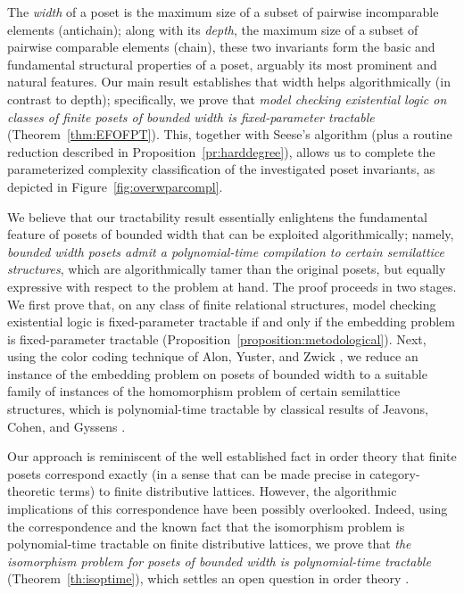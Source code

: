 \documentclass[usletter]{article}
\begin{document}
The \emph{width} of a poset is the maximum size of a subset of pairwise incomparable elements (antichain); 
along with its \emph{depth}, the maximum size of a subset of pairwise comparable elements (chain), 
these two invariants form the basic and fundamental structural properties of a poset, 
arguably its most prominent and natural features.  Our main result establishes that 
width helps algorithmically (in contrast to depth); specifically, 
we prove that \emph{model checking existential logic on classes of finite posets 
of bounded width is fixed-parameter tractable} (Theorem~\ref{thm:EFOFPT}).  
This, together with Seese's  algorithm (plus a routine reduction described in Proposition~\ref{pr:harddegree}), allows us 
to complete the parameterized complexity classification of the investigated poset invariants, 
as depicted in Figure~\ref{fig:overwparcompl}.


We believe that our tractability result essentially enlightens the fundamental feature of posets of bounded width 
that can be exploited algorithmically; namely, \emph{bounded width posets admit a polynomial-time compilation to certain semilattice structures}, which 
are algorithmically tamer than the original posets, but equally expressive with respect to the problem at hand.  
The proof proceeds in two stages.  We first prove that, on any class of finite relational structures, 
model checking existential logic is fixed-parameter tractable if and only 
if the embedding problem is fixed-parameter tractable (Proposition~\ref{proposition:metodological}). Next, 
using 
the color coding technique of Alon, Yuster, and Zwick \cite{AlonYusterZwick95}, 
we reduce an instance of the embedding problem on posets of bounded width to 
a suitable family of instances of the homomorphism problem of certain semilattice structures, 
which is polynomial-time tractable by classical results of Jeavons, Cohen, and Gyssens \cite{JeavonsCohenGyssens97}.   

Our approach is reminiscent of the well established fact in order theory 
that finite posets correspond exactly (in a sense that can be made precise in category-theoretic terms) 
to finite distributive lattices.  However, 
the algorithmic implications of this correspondence 
have been possibly overlooked.  Indeed, using the correspondence and the known fact that 
the isomorphism problem is polynomial-time tractable on finite distributive lattices, 
we prove that \emph{the isomorphism problem for posets of bounded width is polynomial-time tractable} (Theorem~\ref{th:isoptime}), 
which 
settles an open question in order theory \cite[p.~284]{CaspardLeclercMonjardet12}.
\end{document}
